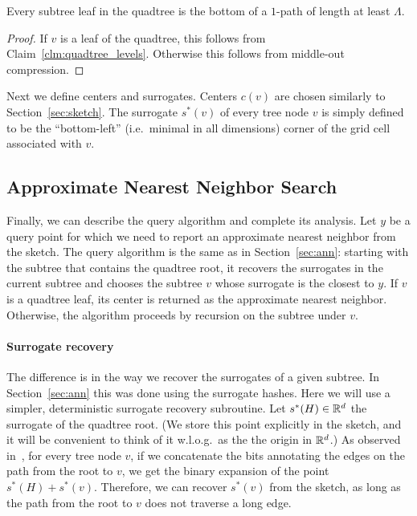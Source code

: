 \begin{claim}\label{clm:leaves}
Every subtree leaf in the quadtree is the bottom of a $1$-path of length at least $\Lambda$.
\end{claim}
\begin{proof}
If $v$ is a leaf of the quadtree, this follows from Claim~\ref{clm:quadtree_levels}. Otherwise this follows from middle-out compression.
\end{proof}

Next we define centers and surrogates.
Centers $c(v)$ are chosen similarly to Section~\ref{sec:sketch}.
The surrogate $s^*(v)$ of every tree node $v$ is simply defined to be the ``bottom-left'' (i.e.~minimal in all dimensions) corner of the grid cell associated with $v$.

\subsection{Approximate Nearest Neighbor Search}
Finally, we can describe the query algorithm and complete its analysis.
Let $y$ be a query point for which we need to report an approximate nearest neighbor from the sketch. The query algorithm is the same as in Section~\ref{sec:ann}: starting with the subtree that contains the quadtree root, it recovers the surrogates in the current subtree and chooses the subtree $v$ whose surrogate is the closest to $y$. If $v$ is a quadtree leaf, its center is returned as the approximate nearest neighbor. Otherwise, the algorithm proceeds by recursion on the subtree under $v$.

\paragraph{Surrogate recovery}
The difference is in the way we recover the surrogates of a given subtree. In Section~\ref{sec:ann} this was done using the surrogate hashes. Here we will use a simpler, deterministic surrogate recovery subroutine.
Let $s^*(H)\in\mathbb R^d$ the surrogate of the quadtree root. (We store this point explicitly in the sketch, and it will be convenient to think of it w.l.o.g.~as the the origin in $\mathbb R^d$.) As observed in~\cite{indyk2017practical}, for every tree node $v$, if we concatenate the bits annotating the edges on the path from the root to $v$, we get the binary expansion of the point $s^*(H)+s^*(v)$. Therefore, we can recover $s^*(v)$ from the sketch, as long as the path from the root to $v$ does not traverse a long edge.

